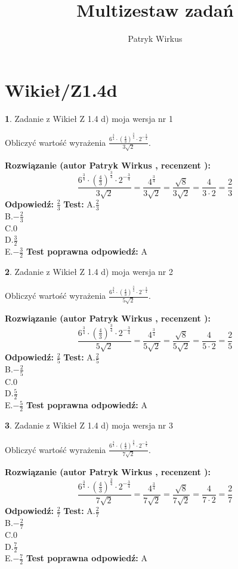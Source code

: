 \documentclass[12pt, a4paper]{article}
\title{Multizestaw zadań}
\author{Patryk Wirkus}
\date{}
\theoremstyle{definition} %
\newtheorem{zad}{}
\newcommand{\kategoria}[1]{\section{#1}}
\newcommand{\zadStart}[1]{\begin{zad}#1\newline}
\newcommand{\zadStop}{\end{zad}}
\newcommand{\rozwStart}[2]{\noindent \textbf{Rozwiązanie (autor #1 , recenzent #2): }\newline}
\newcommand{\rozwStop}{\newline}
\newcommand{\odpStart}{\noindent \textbf{Odpowiedź:}\newline}
\newcommand{\odpStop}{\newline}
\newcommand{\testStart}{\noindent \textbf{Test:}\newline}
\newcommand{\testStop}{\newline}
\newcommand{\kluczStart}{\noindent \textbf{Test poprawna odpowiedź:}\newline}
\newcommand{\kluczStop}{\newline}
\begin{document}
\maketitle

\kategoria{Wikieł/Z1.4d}


\zadStart{Zadanie z Wikieł Z 1.4 d) moja wersja nr 1}

Obliczyć wartość wyrażenia $\frac{6^{\frac{3}{4}}\cdot (\frac{4}{3})^{\frac{3}{4}}\cdot 2^{-\frac{3}{4}}}{3\sqrt{2}}$.
\zadStop
\rozwStart{Patryk Wirkus}{}
$$\frac{6^{\frac{3}{4}}\cdot (\frac{4}{3})^{\frac{3}{4}}\cdot 2^{-\frac{3}{4}}}{3\sqrt{2}} = \frac{4^{\frac{3}{4}}}{3\sqrt{2}} = \frac{\sqrt{8}}{3\sqrt{2}} = \frac{4}{3\cdot 2} = \frac{2}{3}$$
\rozwStop
\odpStart
$\frac{2}{3}$
\odpStop
\testStart
A.$\frac{2}{3}$\\ B.$-\frac{2}{3}$\\ C.$0$\\ D.$\frac{3}{2}$\\ E.$-\frac{3}{2}$
\testStop
\kluczStart
A
\kluczStop



\zadStart{Zadanie z Wikieł Z 1.4 d) moja wersja nr 2}

Obliczyć wartość wyrażenia $\frac{6^{\frac{3}{4}}\cdot (\frac{4}{3})^{\frac{3}{4}}\cdot 2^{-\frac{3}{4}}}{5\sqrt{2}}$.
\zadStop
\rozwStart{Patryk Wirkus}{}
$$\frac{6^{\frac{3}{4}}\cdot (\frac{4}{3})^{\frac{3}{4}}\cdot 2^{-\frac{3}{4}}}{5\sqrt{2}} = \frac{4^{\frac{3}{4}}}{5\sqrt{2}} = \frac{\sqrt{8}}{5\sqrt{2}} = \frac{4}{5\cdot 2} = \frac{2}{5}$$
\rozwStop
\odpStart
$\frac{2}{5}$
\odpStop
\testStart
A.$\frac{2}{5}$\\ B.$-\frac{2}{5}$\\ C.$0$\\ D.$\frac{5}{2}$\\ E.$-\frac{5}{2}$
\testStop
\kluczStart
A
\kluczStop



\zadStart{Zadanie z Wikieł Z 1.4 d) moja wersja nr 3}

Obliczyć wartość wyrażenia $\frac{6^{\frac{3}{4}}\cdot (\frac{4}{3})^{\frac{3}{4}}\cdot 2^{-\frac{3}{4}}}{7\sqrt{2}}$.
\zadStop
\rozwStart{Patryk Wirkus}{}
$$\frac{6^{\frac{3}{4}}\cdot (\frac{4}{3})^{\frac{3}{4}}\cdot 2^{-\frac{3}{4}}}{7\sqrt{2}} = \frac{4^{\frac{3}{4}}}{7\sqrt{2}} = \frac{\sqrt{8}}{7\sqrt{2}} = \frac{4}{7\cdot 2} = \frac{2}{7}$$
\rozwStop
\odpStart
$\frac{2}{7}$
\odpStop
\testStart
A.$\frac{2}{7}$\\ B.$-\frac{2}{7}$\\ C.$0$\\ D.$\frac{7}{2}$\\ E.$-\frac{7}{2}$
\testStop
\kluczStart
A
\kluczStop
\end{document}
